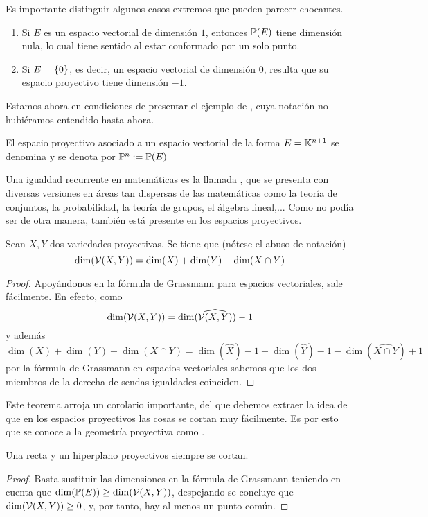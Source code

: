 Es importante distinguir algunos casos extremos que pueden parecer chocantes.
\begin{obs}
	\label{epro_obs_casosExtremosDim}
	\begin{enumerate}
		\item Si $E$ es un espacio vectorial de dimensión $1$, entonces $\mathbb{P}(E)$ tiene dimensión nula, lo cual tiene sentido al estar conformado por un solo punto.
		\item Si $E =\{0\}$, es decir, un espacio vectorial de dimensión $0$, resulta que su espacio proyectivo tiene dimensión $-1$.\qedhere
	\end{enumerate}
\end{obs}
Estamos ahora en condiciones de presentar el ejemplo de , cuya notación no hubiéramos entendido hasta ahora.
\begin{exa}
	\label{C1_exa_espacioCanonico}
	El espacio proyectivo asociado a un espacio vectorial de la forma $E=\mathbb{K}^{n+1}$ se denomina  y se denota por $\mathbb{P}^n:=\mathbb{P}(E)$
\end{exa}
Una igualdad recurrente en matemáticas es la llamada , que se presenta con diversas versiones en áreas tan dispersas de las matemáticas como la teoría de conjuntos, la probabilidad, la teoría de grupos, el álgebra lineal,... Como no podía ser de otra manera, también está presente en los espacios proyectivos.
\begin{theo}
	\label{C1_teo_grassmann}
	Sean $X,Y$ dos variedades proyectivas. Se tiene que (nótese el abuso de notación)
	\begin{equation*}
		\dim(\mathcal{V}(X,Y))=\dim(X)+\dim(Y)-\dim(X\cap Y)
	\end{equation*}
\end{theo}
\begin{proof}
	Apoyándonos en la fórmula de Grassmann para espacios vectoriales, sale fácilmente. En efecto, como  \[\dim(\mathcal{V}(X,Y))=\dim(\widehat{\mathcal{V}(X,Y)})-1\] y además \[\dim(X)+\dim(Y)-\dim(X\cap Y)=\dim(\widehat{X})-1+\dim(\widehat{Y})-1-\dim(\widehat{X\cap Y})+1\] por la fórmula de Grassmann en espacios vectoriales sabemos que los dos miembros de la derecha de sendas igualdades coinciden.
\end{proof}
Este teorema arroja un corolario importante, del que debemos extraer la idea de que en los espacios proyectivos las cosas se cortan muy fácilmente. Es por esto que se conoce a la geometría proyectiva como .
\begin{cor}
	\label{C1_cor_rectaHiperplano}
	Una recta y un hiperplano proyectivos siempre se cortan.
\end{cor}
\begin{proof}
	Basta sustituir las dimensiones en la fórmula de Grassmann teniendo en cuenta que $\dim(\mathbb{P}(E))\geq\dim(\mathcal{V}(X,Y))$, despejando se concluye que $\dim(\mathcal{V}(X,Y))\geq 0$, y, por tanto, hay al menos un punto común.
\end{proof}
